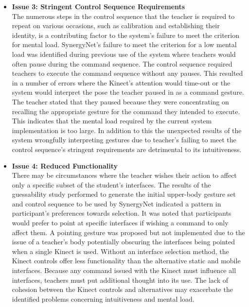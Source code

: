 \documentclass[link]{IWCOMP}
\begin{document}
\begin{itemize}
\item \textbf{Issue 3: Stringent Control Sequence Requirements}\\
The numerous steps in the control sequence that the teacher is required to repeat on various occasions, such as calibration and establishing their identity, is a contributing factor to the system's failure to meet the criterion for mental load.
SynergyNet's failure to meet the criterion for a low mental load was identified during previous use of the system where teachers would often pause during the command sequence.
The control sequence required teachers to execute the command sequence without any pauses.
This resulted in a number of errors where the Kinect's attention would time-out or the system would interpret the pose the teacher paused in as a command gesture.
The teacher stated that they paused because they were concentrating on recalling the appropriate gesture for the command they intended to execute.
This indicates that the mental load required by the current system implementation is too large.
In addition to this the unexpected results of the system wrongfully interpreting gestures due to teacher's failing to meet the control sequence's stringent requirements are detrimental to its intuitiveness.

\item \textbf{Issue 4: Reduced Functionality}\\
There may be circumstances where the teacher wishes their action to affect only a specific subset of the student's interfaces.
The results of the guessability study performed to generate the initial upper-body gesture set and control sequence to be used by SynergyNet indicated a pattern in participant's preferences towards selection.
It was noted that participants would prefer to point at specific interfaces if wishing a command to only affect them.
A pointing gesture was proposed but not implemented due to the issue of a teacher's body potentially obscuring the interfaces being pointed when a single Kinect is used.
Without an interface selection method, the Kinect controls offer less functionality than the alternative static and mobile interfaces.
Because any command issued with the Kinect must influence all interfaces, teachers must put additional thought into its use.
The lack of cohesion between the Kinect controls and alternatives may exacerbate the identified problems concerning intuitiveness and mental load.

\end{itemize}
\end{document}
